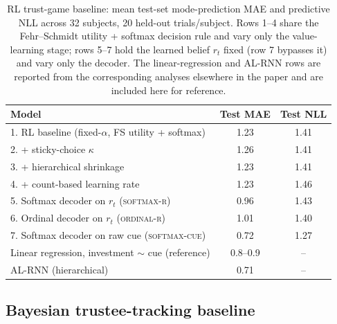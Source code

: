 \documentclass[11pt]{article}
\begin{document}
\begin{table}[h]
\centering
\begin{tabular}{lcc}
\toprule
Model & Test MAE & Test NLL \\
\midrule
1. RL baseline (fixed-$\alpha$, FS utility + softmax) & 1.23 & 1.41 \\
2. \quad + sticky-choice $\kappa$                     & 1.26 & 1.41 \\
3. \quad + hierarchical shrinkage                     & 1.23 & 1.41 \\
4. \quad + count-based learning rate                  & 1.23 & 1.46 \\
5. Softmax decoder on $r_t$ (\textsc{softmax-r})       & 0.96 & 1.43 \\
6. Ordinal decoder on $r_t$ (\textsc{ordinal-r})       & 1.01 & 1.40 \\
7. Softmax decoder on raw cue (\textsc{softmax-cue})   & 0.72 & 1.27 \\
\midrule
Linear regression, investment $\sim$ cue (reference)  & 0.8--0.9 & -- \\
AL-RNN (hierarchical)                                  & 0.71 & -- \\
\bottomrule
\end{tabular}
\caption{RL trust-game baseline: mean test-set mode-prediction MAE and
predictive NLL across 32 subjects, 20 held-out trials/subject. Rows 1--4
share the Fehr--Schmidt utility + softmax decision rule and vary only the
value-learning stage; rows 5--7 hold the learned belief $r_t$ fixed (row 7
bypasses it) and vary only the decoder. The linear-regression and AL-RNN
rows are reported from the corresponding analyses elsewhere in the paper
and are included here for reference.}
\label{tab:rl_results}
\end{table}

\subsection*{Bayesian trustee-tracking baseline}
\label{sec:bayes}
\end{document}
